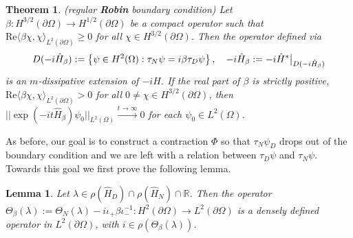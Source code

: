 \documentclass{article}
\numberwithin{equation}{section}
\newtheorem{theorem}{Theorem}[section]
\newtheorem{lemma}{Lemma}[section]
\begin{document}
    \begin{theorem}\label{Robin boundary conditions nice}
    (regular \textbf{Robin} boundary condition) Let $\beta: H^{3/2}(\partial \Omega)\to H^{1/2}(\partial \Omega)$ be a compact operator such that \em$\text{Re} \langle \beta \chi, \chi \rangle_{L^2(\partial \Omega)}\geq 0$ \em for all $\chi \in H^{3/2}(\partial \Omega)$. Then the operator defined via
    \begin{equation}
        D(-i\hat{H}_\beta):=\left\{\psi \in H^2(\Omega):\tau_N \psi=i \beta \tau_D \psi \right\}, \quad -i\hat{H}_\beta:=-i\hat{H}^*\big{|}_{D(-i\hat{H}_\beta)}
    \end{equation}
    is an $m$-dissipative extension of $-i\hat{H}$. If the real part of $\beta$ is strictly positive, \em $\text{Re}\langle \beta \chi, \chi \rangle_{L^2(\partial \Omega)}>0$ for all $0 \neq \chi \in H^{3/2}(\partial \Omega)$\em, then $||\exp(-it\hat{H}_\beta)\psi_0||_{L^2(\Omega)}\xrightarrow{t \to \infty}0$ for each $\psi_0 \in L^2(\Omega)$.
\end{theorem}
As before, our goal is to construct a contraction $\Phi$ so that $\tau_N \psi_D$ drops out of the boundary condition and we are left with a relation between $\tau_D\psi$ and $\tau_N \psi$. Towards this goal we first prove the following lemma.
    \begin{lemma}
        Let $\lambda \in \rho(\hat{H}_D)\cap \rho(\hat{H}_N)\cap \mathbb{R}$. Then the operator $\Theta_\beta(\lambda):=\Theta_N(\lambda)- i\iota_+ \beta \iota_-^{-1}:H^2(\partial \Omega)\to L^2(\partial \Omega)$ is a densely defined operator in $L^2(\partial \Omega)$, with $i \in \rho(\Theta_\beta(\lambda))$.
    \end{lemma}
\end{document}
